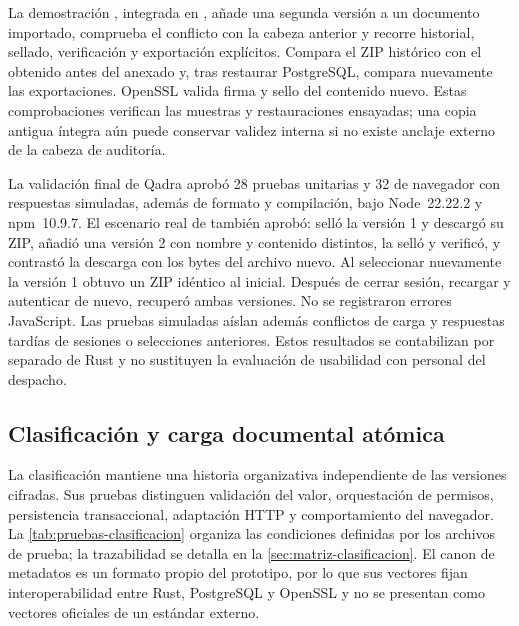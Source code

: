 La demostración , integrada en , añade una segunda versión a un documento importado, comprueba el conflicto con la cabeza anterior y recorre historial, sellado, verificación y exportación explícitos. Compara el ZIP histórico con el obtenido antes del anexado y, tras restaurar PostgreSQL, compara nuevamente las exportaciones. OpenSSL valida firma y sello del contenido nuevo. Estas comprobaciones verifican las muestras y restauraciones ensayadas; una copia antigua íntegra aún puede conservar validez interna si no existe anclaje externo de la cabeza de auditoría.

La validación final de Qadra aprobó 28 pruebas unitarias y 32 de navegador con respuestas simuladas, además de formato y compilación, bajo Node~22.22.2 y npm~10.9.7. El escenario real de  también aprobó: selló la versión 1 y descargó su ZIP, añadió una versión 2 con nombre y contenido distintos, la selló y verificó, y contrastó la descarga con los bytes del archivo nuevo. Al seleccionar nuevamente la versión 1 obtuvo un ZIP idéntico al inicial. Después de cerrar sesión, recargar y autenticar de nuevo, recuperó ambas versiones. No se registraron errores JavaScript. Las pruebas simuladas aíslan además conflictos de carga y respuestas tardías de sesiones o selecciones anteriores. Estos resultados se contabilizan por separado de Rust y no sustituyen la evaluación de usabilidad con personal del despacho.

\subsection{Clasificación y carga documental atómica}\label{sec:pruebas-clasificacion}

La clasificación mantiene una historia organizativa independiente de las versiones cifradas. Sus pruebas distinguen validación del valor, orquestación de permisos, persistencia transaccional, adaptación HTTP y comportamiento del navegador. La \cref{tab:pruebas-clasificacion} organiza las condiciones definidas por los archivos de prueba; la trazabilidad se detalla en la \cref{sec:matriz-clasificacion}. El canon de metadatos es un formato propio del prototipo, por lo que sus vectores fijan interoperabilidad entre Rust, PostgreSQL y OpenSSL y no se presentan como vectores oficiales de un estándar externo.

